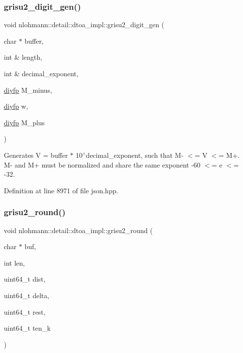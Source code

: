 \subsubsection{\texorpdfstring{grisu2\+\_\+digit\+\_\+gen()}{grisu2\_digit\_gen()}}
{\footnotesize\ttfamily void nlohmann\+::detail\+::dtoa\+\_\+impl\+::grisu2\+\_\+digit\+\_\+gen (\begin{DoxyParamCaption}\item[{char $\ast$}]{buffer,  }\item[{int \&}]{length,  }\item[{int \&}]{decimal\+\_\+exponent,  }\item[{\hyperlink{structnlohmann_1_1detail_1_1dtoa__impl_1_1diyfp}{diyfp}}]{M\+\_\+minus,  }\item[{\hyperlink{structnlohmann_1_1detail_1_1dtoa__impl_1_1diyfp}{diyfp}}]{w,  }\item[{\hyperlink{structnlohmann_1_1detail_1_1dtoa__impl_1_1diyfp}{diyfp}}]{M\+\_\+plus }\end{DoxyParamCaption})\hspace{0.3cm}{\ttfamily [inline]}}

Generates V = buffer $\ast$ 10$^\wedge$decimal\+\_\+exponent, such that M-\/ $<$= V $<$= M+. M-\/ and M+ must be normalized and share the same exponent -\/60 $<$= e $<$= -\/32. 

Definition at line 8971 of file json.\+hpp.

\mbox{\label{namespacenlohmann_1_1detail_1_1dtoa__impl_a9e66e6d0f072aa4fc0627bffc5b1cbd8}} 
\subsubsection{\texorpdfstring{grisu2\+\_\+round()}{grisu2\_round()}}
{\footnotesize\ttfamily void nlohmann\+::detail\+::dtoa\+\_\+impl\+::grisu2\+\_\+round (\begin{DoxyParamCaption}\item[{char $\ast$}]{buf,  }\item[{int}]{len,  }\item[{uint64\+\_\+t}]{dist,  }\item[{uint64\+\_\+t}]{delta,  }\item[{uint64\+\_\+t}]{rest,  }\item[{uint64\+\_\+t}]{ten\+\_\+k }\end{DoxyParamCaption})\hspace{0.3cm}{\ttfamily [inline]}}



